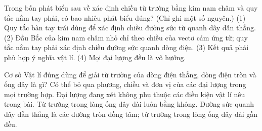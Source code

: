 \begin{ex}
Trong bốn phát biểu sau về xác định chiều từ trường bằng kim nam châm và quy tắc nắm tay phải, có bao nhiêu phát biểu đúng? (Chỉ ghi một số nguyên.) (1) Quy tắc bàn tay trái dùng để xác định chiều đường sức từ quanh dây dẫn thẳng. (2) Đầu Bắc của kim nam châm nhỏ chỉ theo chiều của vectơ cảm ứng từ; quy tắc nắm tay phải xác định chiều đường sức quanh dòng điện. (3) Kết quả phải phù hợp ý nghĩa vật lí. (4) Mọi đại lượng đều là vô hướng.
\end{ex}

\begin{ex}
Cơ sở Vật lí đúng dùng để giải từ trường của dòng điện thẳng, dòng điện tròn và ống dây là gì?
\choice
{Có thể bỏ qua phương, chiều và đơn vị của các đại lượng trong mọi trường hợp.}
{Đại lượng đang xét không phụ thuộc các điều kiện vật lí nêu trong bài.}
{Từ trường trong lòng ống dây dài luôn bằng không.}
{\True Đường sức quanh dây dẫn thẳng là các đường tròn đồng tâm; từ trường trong lòng ống dây dài gần đều.}
\end{ex}

